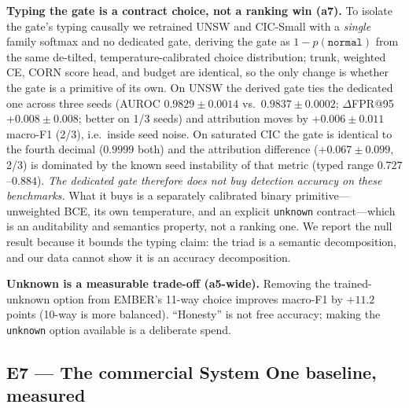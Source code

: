 \documentclass[sigconf,anonymous=false]{acmart}
\begin{document}
\textbf{Typing the gate is a contract choice, not a ranking win (a7).} To isolate the gate's typing causally we retrained UNSW and CIC-Small with a \emph{single} family softmax and no dedicated gate, deriving the gate as $1-p(\texttt{normal})$ from the same de-tilted, temperature-calibrated choice distribution; trunk, weighted CE, CORN score head, and budget are identical, so the only change is whether the gate is a primitive of its own. On UNSW the derived gate ties the dedicated one across three seeds (AUROC $0.9829\pm0.0014$ vs.\ $0.9837\pm0.0002$; $\Delta$FPR@95 $+0.008\pm0.008$; better on 1/3 seeds) and attribution moves by $+0.006\pm0.011$ macro-F1 (2/3), i.e.\ inside seed noise. On saturated CIC the gate is identical to the fourth decimal ($0.9999$ both) and the attribution difference ($+0.067\pm0.099$, 2/3) is dominated by the known seed instability of that metric (typed range $0.727$--$0.884$). \emph{The dedicated gate therefore does not buy detection accuracy on these benchmarks.} What it buys is a separately calibrated binary primitive---unweighted BCE, its own temperature, and an explicit \texttt{unknown} contract---which is an auditability and semantics property, not a ranking one. We report the null result because it bounds the typing claim: the triad is a semantic decomposition, and our data cannot show it is an accuracy decomposition.

\textbf{Unknown is a measurable trade-off (a5-wide).} Removing the trained-unknown option from EMBER's 11-way choice improves macro-F1 by $+11.2$ points (10-way is more balanced). ``Honesty'' is not free accuracy; making the \texttt{unknown} option available is a deliberate spend.

\subsection{E7 --- The commercial System One baseline, measured}
\label{sec:e7}
\end{document}
